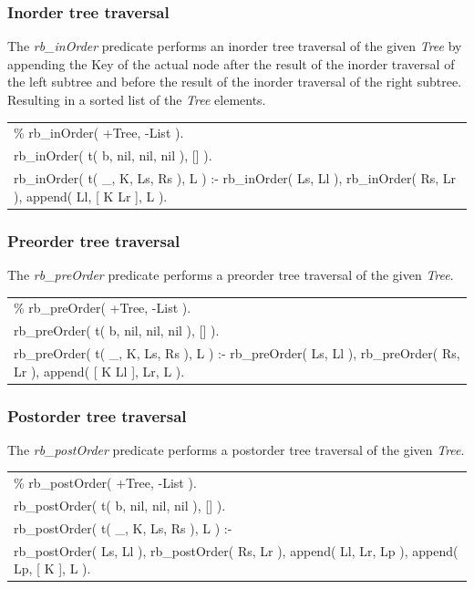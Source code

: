 \documentclass{article}
\newenvironment{code}{\obeycr\begin{it}\nopagebreak\addvspace{1ex}\noindent\footnotesize\begin{tabular}{|p{0.95\textwidth}|}\hline}{\\\hline\end{tabular}\par\addvspace{1ex}\end{it}\restorecr}
\newcommand{\inlinecode}[1]{\textit{#1}}
\begin{document}
\subsubsection[Inorder]{Inorder tree traversal}
The \inlinecode{rb\_inOrder} predicate performs an inorder tree traversal of the given \inlinecode{Tree} by appending the Key of the actual node after the result of the inorder traversal of the left subtree and before the result of the inorder traversal of the right subtree. Resulting in a sorted list of the \inlinecode{Tree} elements.

\begin{code}
\% rb\_inOrder( +Tree, -List ).\\
rb\_inOrder( t( b, nil, nil, nil ), [] ).\\
rb\_inOrder( t( \_, K, Ls, Rs ), L ) :-
\hspace{2ex}rb\_inOrder( Ls, Ll ), 
\hspace{2ex}rb\_inOrder( Rs, Lr ),
\hspace{2ex}append( Ll, [ K \textbar Lr ], L ).
\end{code}

\subsubsection[Preorder]{Preorder tree traversal}
The \inlinecode{rb\_preOrder} predicate performs a preorder tree traversal of the given \inlinecode{Tree}.

\begin{code}
\% rb\_preOrder( +Tree, -List ).\\
rb\_preOrder( t( b, nil, nil, nil ), [] ).\\
rb\_preOrder( t( \_, K, Ls, Rs ), L ) :-
\hspace{2ex}rb\_preOrder( Ls, Ll ), 
\hspace{2ex}rb\_preOrder( Rs, Lr ),
\hspace{2ex}append( [ K \textbar Ll ], Lr, L ).
\end{code}

\subsubsection[Postorder]{Postorder tree traversal}
The \inlinecode{rb\_postOrder} predicate performs a postorder tree traversal of the given \inlinecode{Tree}.

\begin{code}
\% rb\_postOrder( +Tree, -List ).\\
rb\_postOrder( t( b, nil, nil, nil ), [] ).\\
rb\_postOrder( t( \_, K, Ls, Rs ), L ) :-\\
\hspace{2ex}rb\_postOrder( Ls, Ll ), 
\hspace{2ex}rb\_postOrder( Rs, Lr ),
\hspace{2ex}append( Ll, Lr, Lp ), 
\hspace{2ex}append( Lp, [ K ], L ).
\end{code}
\end{document}
